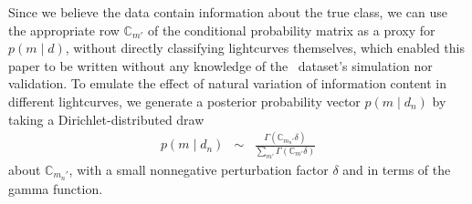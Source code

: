 Since we believe the data contain information about the true class, we can use the appropriate row $\mathbb{C}_{m'}$ of the conditional probability matrix as a proxy for $p(m \mid d)$, without directly classifying lightcurves themselves, which enabled this paper to be written without any knowledge of the \plasticc\ dataset's simulation nor validation.
To emulate the effect of natural variation of information content in different lightcurves, we generate a posterior probability vector $p(m \mid d_{n})$ by taking a Dirichlet-distributed draw
\begin{eqnarray}
  \label{eq:cmtoprob}
  p(m \mid d_{n}) &\sim& \frac{\Gamma(\mathbb{C}_{m_{n}'} \delta)}{\sum_{m'} \Gamma(\mathbb{C}_{m'} \delta)}
\end{eqnarray}
about $\mathbb{C}_{m_{n}'}$, with a small nonnegative perturbation factor $\delta$ and in terms of the gamma function.

